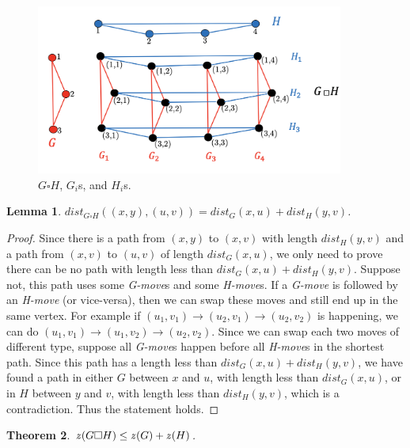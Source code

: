 \documentclass[1p]{elsarticle}
\newtheorem{theorem}{Theorem}
\newtheorem{lemma}[theorem]{Lemma}
\newcommand{\zn}{\ooalign{$z$\cr\hfil\rule[.5ex]{.2em}{.08ex}\hfil\cr}}
\begin{document}
\begin{figure}[h!]
	
	\centering
	\includegraphics[width=0.9\textwidth]{fig/cp3.png}
	\caption{$G \square H$, $G_i$s, and $H_i$s.}
	\label{fig:p1}
\end{figure}



\begin{lemma} \label{shortestpathlemma}
	$dist_{G \square H}((x,y),(u,v)) = dist_G(x,u) + dist_H(y,v)$.
\end{lemma}
\begin{proof}
	Since there is a path from $(x,y)$ to $(x,v)$ with length $dist_H(y,v)$ and a path from $(x,v)$ to $(u,v)$ of length
	$dist_G(x,u)$, we only need to prove there can be no path with length less than $dist_G(x,u) + dist_H(y,v)$.
	Suppose not, this path uses some {\it G-move}s and some {\it H-move}s. If a {\it G-move} is followed by an {\it
	H-move} (or vice-versa), then we can swap these moves and still end up in the same vertex. For example if $(u_1,v_1)
	\rightarrow (u_2,v_1) \rightarrow (u_2,v_2)$ is happening, we can do $(u_1,v_1) \rightarrow (u_1,v_2) \rightarrow
	(u_2,v_2)$. Since we can swap each two moves of different type, suppose all {\it G-move}s happen before all {\it
	H-move}s in the shortest path. Since this path has a length less than $dist_G(x,u) + dist_H(y,v)$, we have found a
	path in either $G$ between $x$ and $u$, with length less than $dist_G(x,u)$, or in $H$ between $y$ and $v$, with
	length less than $dist_H(y,v)$, which is a contradiction. Thus the statement holds.
\end{proof}




\begin{theorem}
	\label{T2}
	$\zn(G \square H) \leq \zn(G) + \zn(H)$.
\end{theorem}
\end{document}
